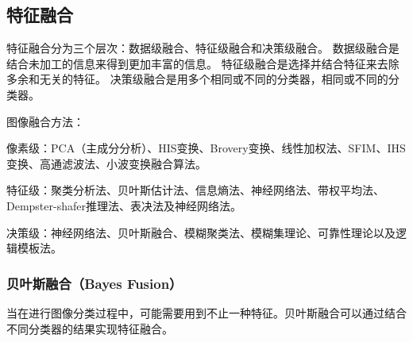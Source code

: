 \begin{comment}
\subsection{经典特征描述方法}

\subsubsection{SIFT特征}

\subsubsection{HOG特征}

\subsubsection{LBP特征}

\subsubsection{Shape Context}

\subsubsection{Fisher Vector}
\end{comment}

\subsection{特征融合}
特征融合分为三个层次：数据级融合、特征级融合和决策级融合。
数据级融合是结合未加工的信息来得到更加丰富的信息。
特征级融合是选择并结合特征来去除多余和无关的特征。
决策级融合是用多个相同或不同的分类器，相同或不同的分类器。

图像融合方法：

像素级：PCA（主成分分析）、HIS变换、Brovery变换、线性加权法、SFIM、IHS变换、高通滤波法、小波变换融合算法。

特征级：聚类分析法、贝叶斯估计法、信息熵法、神经网络法、带权平均法、Dempster-shafer推理法、表决法及神经网络法。

决策级：神经网络法、贝叶斯融合、模糊聚类法、模糊集理论、可靠性理论以及逻辑模板法。

\subsubsection{贝叶斯融合（Bayes Fusion）}
当在进行图像分类过程中，可能需要用到不止一种特征。贝叶斯融合可以通过结合不同分类器的结果实现特征融合。



\begin{comment}
\begin{itemize}
\item 基于灰度共生矩阵的方法
\item 灰度-梯度共生矩阵分析法
\item 灰度行程长度统计法
\item 小波分析法
\item 基于Gabor小波变换的纹理分析法
\end{itemize}
\end{comment}
